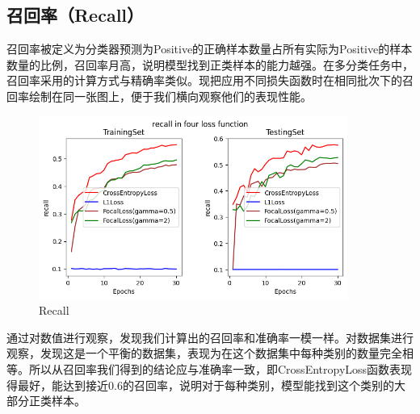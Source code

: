 \documentclass{article}
\begin{document}
\subsection{召回率（Recall）}
召回率被定义为分类器预测为Positive的正确样本数量占所有实际为Positive的样本数量的比例，召回率月高，说明模型找到正类样本的能力越强。在多分类任务中，召回率采用的计算方式与精确率类似。现把应用不同损失函数时在相同批次下的召回率绘制在同一张图上，便于我们横向观察他们的表现性能。
\begin{figure}[H]
    \centering
    \includegraphics[width=0.9\textwidth]{Figure/Recall.png}
    \caption{Recall}
    \label{fig:Recall}
\end{figure}
通过对数值进行观察，发现我们计算出的召回率和准确率一模一样。对数据集进行观察，发现这是一个平衡的数据集，表现为在这个数据集中每种类别的数量完全相等。所以从召回率我们得到的结论应与准确率一致，即CrossEntropyLoss函数表现得最好，能达到接近0.6的召回率，说明对于每种类别，模型能找到这个类别的大部分正类样本。
\end{document}
